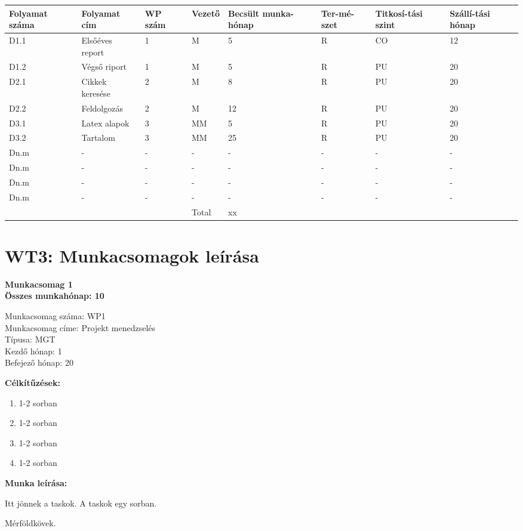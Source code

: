 \documentclass{report}
\begin{document}
\Large
\begin{tabular}{|p{}|p{}|p{}|p{}|p{}|p{}|p{}|p{}|}
\hline
\textbf{Folyamat száma}  & \textbf{Folyamat cím} & \textbf{WP szám} & \textbf{Vezető} & \textbf{Becsült munka-hónap} & \textbf{Ter-mé-szet} & \textbf{Titkosí-tási szint} & \textbf{Szállí-tási hónap} \\[3ex]
\hline
D1.1 & Elsőéves report & 1 & M & 5 & R & CO & 12 \\ [3ex]
\hline
D1.2 & Végső riport & 1 & M & 5 & R & PU & 20 \\ [3ex]
\hline
D2.1 & Cikkek keresése & 2 & M & 8 & R & PU & 20 \\ [3ex]
\hline
D2.2 & Feldolgozás & 2 & M & 12 & R & PU & 20 \\ [3ex]
\hline
D3.1 & Latex alapok & 3 & MM & 5 & R & PU & 20 \\ [3ex]
\hline
D3.2 & Tartalom & 3 & MM & 25 & R & PU & 20 \\ [3ex]
\hline
Dn.m & - & - & - & - & - & - & - \\ [3ex]
\hline
Dn.m & - & - & - & - & - & - & - \\ [3ex]
\hline
Dn.m & - & - & - & - & - & - & - \\ [3ex]
\hline
Dn.m & - & - & - & - & - & - & - \\ [3ex]
\hline
\multicolumn{3}{c|}{}& Total & xx & \multicolumn{2}{|c}{} \\ [3ex]
\cline{4-5}
\end{tabular}
\normalsize

\newpage
\section*{WT3: Munkacsomagok leírása}


\Large{\textbf{Munkacsomag 1}}
\bigskip\\
\large{\textbf{Összes munkahónap: 10}}
\bigskip 



Munkacsomag száma: WP1 \\
Munkacsomag címe: Projekt menedzselés \\
Típusa: MGT \\
Kezdő hónap: 1 \\
Befejező hónap: 20 \\
\medskip

\textbf{Célkítűzések:}
\medskip

\begin{enumerate}
    \item 1-2 sorban
    \item 1-2 sorban
    \item 1-2 sorban
    \item 1-2 sorban
\end{enumerate}


\textbf{Munka leírása:}
\medskip

Itt jönnek a taskok. 
A taskok egy sorban.

\medskip
Mérföldkövek.
\end{document}

